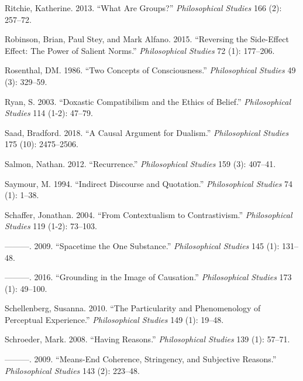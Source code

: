 \documentclass[
  10pt,
  letterpaper,
  DIV=11,
  numbers=noendperiod,
  twoside]{scrartcl}
\newlength{\cslhangindent}
\newenvironment{CSLReferences}[2] %
 {\begin{list}{}{%
  \setlength{\itemindent}{0pt}
  \setlength{\leftmargin}{0pt}
  \setlength{\parsep}{0pt}
  \ifodd #1
   \setlength{\leftmargin}{\cslhangindent}
   \setlength{\itemindent}{-1\cslhangindent}
  \fi
  \setlength{\itemsep}{#2\baselineskip}}}
 {\end{list}}
\begin{document}
\begin{CSLReferences}{1}{0}
Ritchie, Katherine. 2013. {``What Are Groups?''} \emph{Philosophical
Studies} 166 (2): 257--72.

Robinson, Brian, Paul Stey, and Mark Alfano. 2015. {``Reversing the
Side-Effect Effect: The Power of Salient Norms.''} \emph{Philosophical
Studies} 72 (1): 177--206.

Rosenthal, DM. 1986. {``Two Concepts of Consciousness.''}
\emph{Philosophical Studies} 49 (3): 329--59.

Ryan, S. 2003. {``Doxastic Compatibilism and the Ethics of Belief.''}
\emph{Philosophical Studies} 114 (1-2): 47--79.

Saad, Bradford. 2018. {``A Causal Argument for Dualism.''}
\emph{Philosophical Studies} 175 (10): 2475--2506.

Salmon, Nathan. 2012. {``Recurrence.''} \emph{Philosophical Studies} 159
(3): 407--41.

Saymour, M. 1994. {``Indirect Discourse and Quotation.''}
\emph{Philosophical Studies} 74 (1): 1--38.

Schaffer, Jonathan. 2004. {``From Contextualism to Contrastivism.''}
\emph{Philosophical Studies} 119 (1-2): 73--103.

---------. 2009. {``Spacetime the One Substance.''} \emph{Philosophical
Studies} 145 (1): 131--48.

---------. 2016. {``Grounding in the Image of Causation.''}
\emph{Philosophical Studies} 173 (1): 49--100.

Schellenberg, Susanna. 2010. {``The Particularity and Phenomenology of
Perceptual Experience.''} \emph{Philosophical Studies} 149 (1): 19--48.

Schroeder, Mark. 2008. {``Having Reasons.''} \emph{Philosophical
Studies} 139 (1): 57--71.

---------. 2009. {``Means-End Coherence, Stringency, and Subjective
Reasons.''} \emph{Philosophical Studies} 143 (2): 223--48.


\end{CSLReferences}
\end{document}
